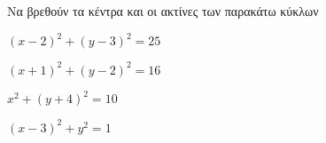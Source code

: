 Να βρεθούν τα κέντρα και οι ακτίνες των παρακάτω κύκλων
\begin{alist}
\item $ (x-2)^2+(y-3)^2=25 $
\item $ (x+1)^2+(y-2)^2=16 $
\item $ x^2+(y+4)^2=10 $
\item $ (x-3)^2+y^2=1 $
\end{alist}
